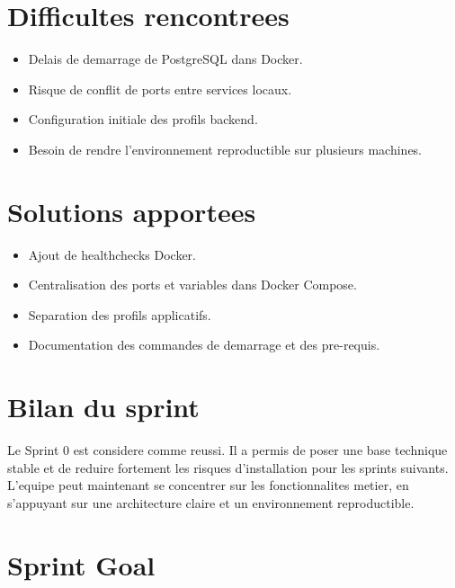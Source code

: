 \documentclass[12pt,a4paper]{report}
\begin{document}
\section{Difficultes rencontrees}

\begin{itemize}[itemsep=0.3em]
    \item Delais de demarrage de PostgreSQL dans Docker.
    \item Risque de conflit de ports entre services locaux.
    \item Configuration initiale des profils backend.
    \item Besoin de rendre l'environnement reproductible sur plusieurs machines.
\end{itemize}

\section{Solutions apportees}

\begin{itemize}[itemsep=0.3em]
    \item Ajout de healthchecks Docker.
    \item Centralisation des ports et variables dans Docker Compose.
    \item Separation des profils applicatifs.
    \item Documentation des commandes de demarrage et des pre-requis.
\end{itemize}

\section{Bilan du sprint}

Le Sprint 0 est considere comme reussi. Il a permis de poser une base technique stable et de reduire fortement les risques d'installation pour les sprints suivants. L'equipe peut maintenant se concentrer sur les fonctionnalites metier, en s'appuyant sur une architecture claire et un environnement reproductible.

\iffalse

\section{Sprint Goal}

\begin{center}
\end{center}
\end{document}
